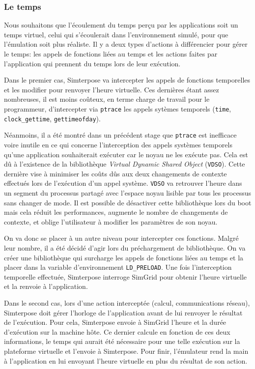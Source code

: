 \subsubsection{Le temps}
\label{subsubsection:time}

Nous souhaitons que l'écoulement du temps perçu par les applications soit un
temps virtuel, celui qui s'écoulerait dans l'environnement simulé, pour que
l'émulation soit plus réaliste. Il y a deux types d'actions à différencier pour
gérer le temps: les appels de fonctions liées au temps et les actions faites par
l'application qui prennent du temps lors de leur exécution.

Dans le premier cas, Simterpose va intercepter les appels de fonctions
temporelles et les modifier pour renvoyer l'heure virtuelle. Ces dernières étant
assez nombreuses, il est moins coûteux, en terme charge de travail pour
le programmeur, d'intercepter via
\texttt{ptrace} les appels sytèmes temporels (\texttt{time},
\texttt{clock\_gettime}, \texttt{gettimeofday}).

Néanmoins, il a été montré dans un précédent stage
\citep{CHLOE:Emulationapplicationdistribuees} que \texttt{ptrace} est inefficace
voire inutile en ce qui concerne l'interception des appels systèmes temporels
qu'une application souhaiterait exécuter car le noyau ne les exécute pas. Cela
est dû à l'existence de la bibliothèque \textit{Virtual Dynamic Shared Object}
(\texttt{VDSO}). Cette dernière vise à minimiser les coûts dûs aux deux changements de contexte effectués lors de l'exécution d'un appel système. \texttt{VDSO} va retrouver l'heure dans un segment du processus partagé avec l'espace noyau lisible par tous les processus sans changer de mode. Il est possible de désactiver cette bibliothèque lors du boot mais cela réduit les performances, augmente le nombre de changements de contexte, et oblige l'utilisateur à modifier les paramètres de son noyau.

On va donc se placer à un autre niveau pour intercepter ces
fonctions. Malgré leur nombre, il a été décidé d'agir lors du
préchargement de bibliothèque. On va créer une bibliothèque qui
surcharge les appels de fonctions liées au temps et la placer dans la
variable d'environnement \texttt{LD\_PRELOAD}. Une fois l'interception
temporelle effectuée, Simterpose interroge SimGrid pour obtenir
l'heure virtuelle et la renvoie à l'application.

Dans le second cas, lors d'une action interceptée (calcul, communications
réseau), Simterpose doit gérer l'horloge de l'application avant de lui renvoyer
le résultat de l'exécution. Pour cela, Simterpose envoie à SimGrid l'heure et la
durée d'exécution sur la machine hôte. Ce dernier calcule en fonction de ces
deux informations, le temps qui aurait été nécessaire pour une telle exécution
sur la plateforme virtuelle et l'envoie à Simterpose. Pour finir, l'émulateur
rend la main à l'application en lui envoyant l'heure virtuelle en plus du
résultat de son action.
